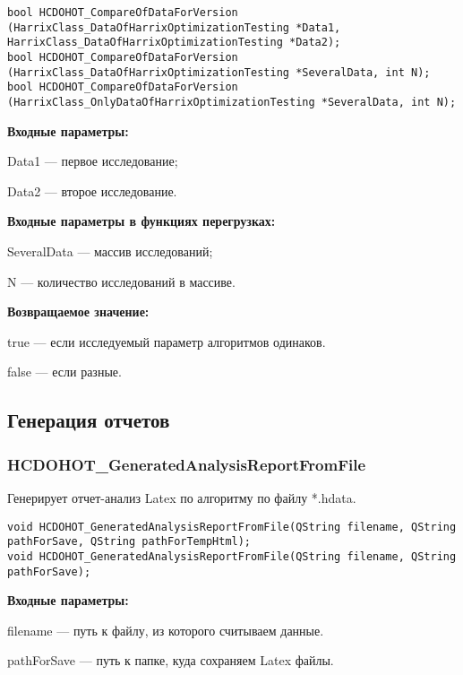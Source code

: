 \documentclass[a4paper,12pt]{article}
\begin{document}
\begin{lstlisting}[label=code_syntax_HCDOHOT_CompareOfDataForVersion,caption=Синтаксис]
bool HCDOHOT_CompareOfDataForVersion (HarrixClass_DataOfHarrixOptimizationTesting *Data1, HarrixClass_DataOfHarrixOptimizationTesting *Data2);
bool HCDOHOT_CompareOfDataForVersion (HarrixClass_DataOfHarrixOptimizationTesting *SeveralData, int N);
bool HCDOHOT_CompareOfDataForVersion (HarrixClass_OnlyDataOfHarrixOptimizationTesting *SeveralData, int N);
\end{lstlisting}

\textbf{Входные параметры:}

Data1 --- первое исследование;

Data2 --- второе исследование.

\textbf{Входные параметры в функциях перегрузках:}

SeveralData --- массив исследований;

N --- количество исследований в массиве.

\textbf{Возвращаемое значение:}

true --- если исследуемый параметр алгоритмов одинаков.

false --- если разные.


\subsection{Генерация отчетов}

\subsubsection{HCDOHOT\_GeneratedAnalysisReportFromFile}\label{HCDOHOT_GeneratedAnalysisReportFromFile}

Генерирует отчет-анализ Latex по алгоритму по файлу *.hdata.


\begin{lstlisting}[label=code_syntax_HCDOHOT_GeneratedAnalysisReportFromFile,caption=Синтаксис]
void HCDOHOT_GeneratedAnalysisReportFromFile(QString filename, QString pathForSave, QString pathForTempHtml);
void HCDOHOT_GeneratedAnalysisReportFromFile(QString filename, QString pathForSave);
\end{lstlisting}

\textbf{Входные параметры:}

filename --- путь к файлу, из которого считываем данные.

pathForSave --- путь к папке, куда сохраняем Latex файлы.
\end{document}
